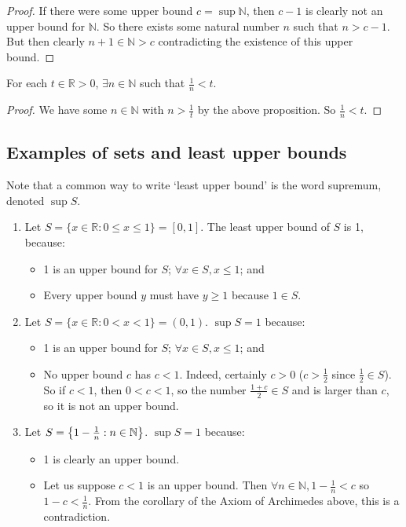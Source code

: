\begin{proof}
	If there were some upper bound \(c = \sup \mathbb N\), then \(c-1\) is clearly not an upper bound for \(\mathbb N\).
	So there exists some natural number \(n\) such that \(n > c-1\).
	But then clearly \(n+1 \in \mathbb N > c\) contradicting the existence of this upper bound.
\end{proof}
\begin{corollary}
	For each \(t \in \mathbb R > 0\), \(\exists n \in \mathbb N\) such that \(\frac{1}{n} < t\).
\end{corollary}
\begin{proof}
	We have some \(n \in \mathbb N\) with \(n > \frac{1}{t}\) by the above proposition.
	So \(\frac{1}{n} < t\).
\end{proof}

\subsection{Examples of sets and least upper bounds}
Note that a common way to write `least upper bound' is the word supremum, denoted \(\sup S\).
\begin{enumerate}
	\item Let \(S = \{ x \in \mathbb R: 0 \leq x \leq 1 \} = [0, 1]\).
	      The least upper bound of \(S\) is 1, because:
	      \begin{itemize}
		      \item 1 is an upper bound for \(S\); \(\forall x \in S, x\leq1 \); and
		      \item Every upper bound \(y\) must have \(y \geq 1\) because \(1 \in S\).
	      \end{itemize}
	\item Let \(S = \{ x \in \mathbb R: 0 < x < 1 \} = (0, 1)\).
	      \(\sup S = 1\) because:
	      \begin{itemize}
		      \item 1 is an upper bound for \(S\); \(\forall x \in S, x \leq 1\); and
		      \item No upper bound \(c\) has \(c<1\).
		            Indeed, certainly \(c>0\) (\(c > \frac{1}{2}\) since \(\frac{1}{2} \in S\)).
		            So if \(c<1\), then \(0<c<1\), so the number \(\frac{1+c}{2} \in S\) and is larger than \(c\), so it is not an upper bound.
	      \end{itemize}
	\item Let \(S = \qty{ 1 - \frac{1}{n}: n \in \mathbb N }\).
	      \(\sup S = 1\) because:
	      \begin{itemize}
		      \item 1 is clearly an upper bound.
		      \item Let us suppose \(c < 1\) is an upper bound.
		            Then \(\forall n \in \mathbb N, 1 - \frac{1}{n} < c\) so \(1 - c < \frac{1}{n}\).
		            From the corollary of the Axiom of Archimedes above, this is a contradiction.
	      \end{itemize}
\end{enumerate}
